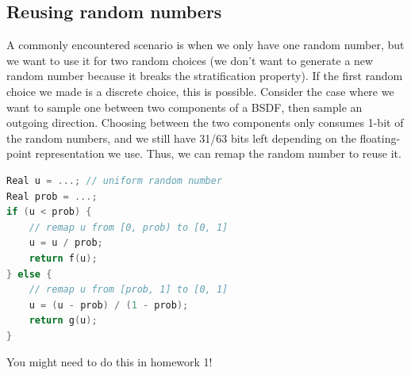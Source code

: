 \subsection{Reusing random numbers}
A commonly encountered scenario is when we only have one random number, but we want to use it for two random choices (we don't want to generate a new random number because it breaks the stratification property). If the first random choice we made is a discrete choice, this is possible. Consider the case where we want to sample one between two components of a BSDF, then sample an outgoing direction. Choosing between the two components only consumes 1-bit of the random numbers, and we still have 31/63 bits left depending on the floating-point representation we use. Thus, we can remap the random number to reuse it. 
\begin{lstlisting}[language=c++]
Real u = ...; // uniform random number
Real prob = ...;
if (u < prob) {
    // remap u from [0, prob) to [0, 1]
    u = u / prob;
    return f(u);
} else {
    // remap u from [prob, 1] to [0, 1]
    u = (u - prob) / (1 - prob);
    return g(u);
}
\end{lstlisting}

You might need to do this in homework 1!

